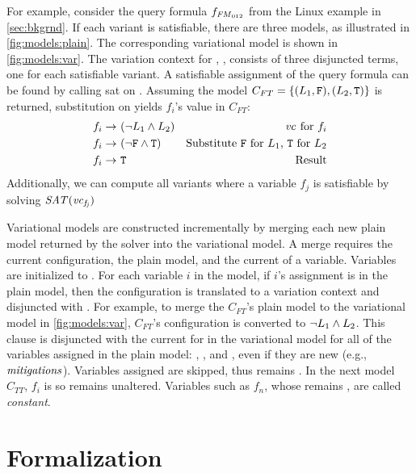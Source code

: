 For example, consider the query formula $f_{\text{\ensuremath{\mathit{FM}_{012}}}}$ from the
Linux example in \autoref{sec:bkgrnd}.
If each variant is satisfiable, there are three models, as illustrated in
\autoref{fig:models:plain}. The corresponding variational model is shown in
\autoref{fig:models:var}.
The variation context for \SatVar{}, \Satfmf{}, consists of three
disjuncted terms, one
for each satisfiable variant. A satisfiable assignment of the query
formula can be found by calling \ac{sat} on \Satfmf{}. Assuming the model $C_{FT} =
\{(L_{1}{}, \texttt{F}{}), (L_{2}{}, \texttt{T}{})\}$ is returned, substitution on
 yields $f_{i}$'s value in $C_{FT}$:
%
\begin{align*}
  f_{i} \rightarrow\ & (\neg L_{1}{} \wedge L_{2}{}) & \text{\ensuremath{\mathit{vc}_{}} for $f_{i}$} \\
  f_{i} \rightarrow\ & (\neg \texttt{F}{} \wedge \texttt{T}{}) & \text{Substitute \texttt{F}{} for \ensuremath{L_{1}}{}, \texttt{T}{} for \ensuremath{L_{2}}{}} \\
  f_{i} \rightarrow\ & \texttt{T}{} & \text{Result}
\end{align*}%
%
Additionally, we can compute all variants where a variable $f_j$ is
satisfiable by solving $\mathit{SAT(\mathit{vc}_{f_j})}$

Variational models are constructed incrementally by merging each new plain model
returned by the solver into the variational model. A merge requires the current
configuration, the plain model, and the current \vc{} of a variable. Variables are
initialized to \fls{}. For each variable $i$ in the model, if $i$'s assignment
is \tru{} in the plain model, then the configuration is translated to a
variation context and disjuncted with . For example, to merge the
$C_{FT}$'s plain model to the variational model in \autoref{fig:models:var},
$C_{FT}$'s configuration is converted to $\neg L_{1}{} \wedge L_{2}{}$. This
clause is disjuncted with the current \vc{} for in the variational model
for all of the variables assigned \tru{} in the plain model: ,
, and , even if they are new (e.g.,
$\mathit{mitigations}$). Variables assigned \fls{} are skipped, thus  remains
\fls{}. In the next model $C_{TT}$, $f_{i}$ is \fls{} so  remains
unaltered. Variables such as $f_{n}$, whose \vc{} remains \fls{}, are called
\textit{constant}.

\section{Formalization}



